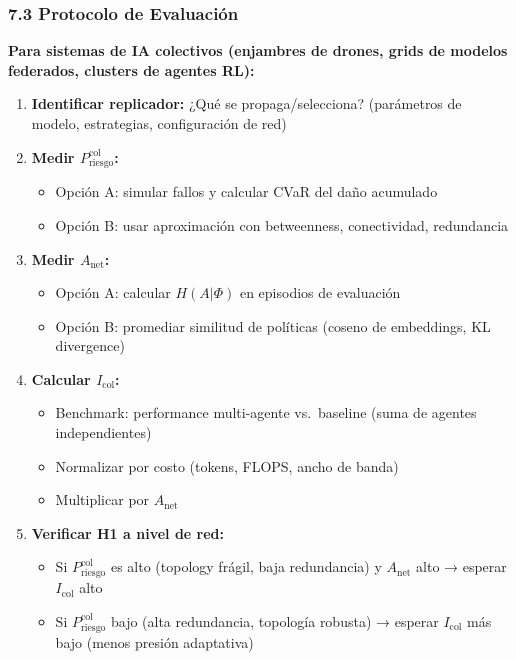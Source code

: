 \subsubsection{7.3 Protocolo de
Evaluación}\label{protocolo-de-evaluaciuxf3n}

\textbf{Para sistemas de IA colectivos (enjambres de drones, grids de
modelos federados, clusters de agentes RL):}

\begin{enumerate}
\def\labelenumi{\arabic{enumi}.}
\tightlist
\item
  \textbf{Identificar replicador:} ¿Qué se propaga/selecciona?
  (parámetros de modelo, estrategias, configuración de red)
\item
  \textbf{Medir \(P_{\text{riesgo}}^{\text{col}}\):}

  \begin{itemize}
  \tightlist
  \item
    Opción A: simular fallos y calcular CVaR del daño acumulado\\
  \item
    Opción B: usar aproximación con betweenness, conectividad,
    redundancia
  \end{itemize}
\item
  \textbf{Medir \(A_{\text{net}}\):}

  \begin{itemize}
  \tightlist
  \item
    Opción A: calcular \(H(A|\Phi)\) en episodios de evaluación\\
  \item
    Opción B: promediar similitud de políticas (coseno de embeddings, KL
    divergence)
  \end{itemize}
\item
  \textbf{Calcular \(I_{\text{col}}\):}

  \begin{itemize}
  \tightlist
  \item
    Benchmark: performance multi-agente vs.~baseline (suma de agentes
    independientes)\\
  \item
    Normalizar por costo (tokens, FLOPS, ancho de banda)\\
  \item
    Multiplicar por \(A_{\text{net}}\)
  \end{itemize}
\item
  \textbf{Verificar H1 a nivel de red:}

  \begin{itemize}
  \tightlist
  \item
    Si \(P_{\text{riesgo}}^{\text{col}}\) es alto (topology frágil, baja
    redundancia) y \(A_{\text{net}}\) alto → esperar \(I_{\text{col}}\)
    alto\\
  \item
    Si \(P_{\text{riesgo}}^{\text{col}}\) bajo (alta redundancia,
    topología robusta) → esperar \(I_{\text{col}}\) más bajo (menos
    presión adaptativa)
  \end{itemize}
\end{enumerate}


